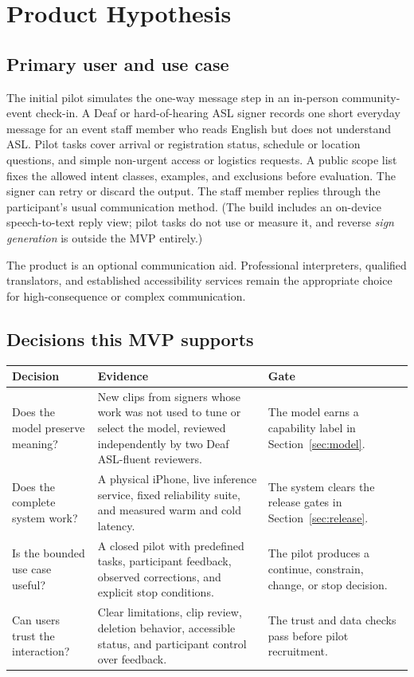 \documentclass[11pt]{article}
\begin{document}
\section{Product Hypothesis}

\subsection{Primary user and use case}

The initial pilot simulates the one-way message step in an in-person community-event
check-in. A Deaf or hard-of-hearing ASL signer records one short everyday message for
an event staff member who reads English but does not understand ASL. Pilot tasks
cover arrival or registration status, schedule or location questions, and simple
non-urgent access or logistics requests. A public scope list fixes the allowed intent
classes, examples, and exclusions before evaluation. The signer can retry or discard
the output. The staff member replies through the participant's usual communication
method. (The build includes an on-device speech-to-text reply view; pilot tasks do
not use or measure it, and reverse \emph{sign generation} is outside the MVP
entirely.)

The product is an optional communication aid. Professional interpreters, qualified
translators, and established accessibility services remain the appropriate choice for
high-consequence or complex communication.

\subsection{Decisions this MVP supports}

\begin{center}
\begin{tabularx}{\textwidth}{@{}P{2.8cm}YY@{}}
\toprule
Decision & Evidence & Gate \\
\midrule
Does the model preserve meaning? & New clips from signers whose work was not used to
tune or select the model, reviewed independently by two Deaf ASL-fluent reviewers. &
The model earns a capability label in Section~\ref{sec:model}. \\
Does the complete system work? & A physical iPhone, live inference service, fixed
reliability suite, and measured warm and cold latency. & The system clears the release
gates in Section~\ref{sec:release}. \\
Is the bounded use case useful? & A closed pilot with predefined tasks, participant
feedback, observed corrections, and explicit stop conditions. & The pilot produces a
continue, constrain, change, or stop decision. \\
Can users trust the interaction? & Clear limitations, clip review, deletion behavior,
accessible status, and participant control over feedback. & The trust and data checks
pass before pilot recruitment. \\
\bottomrule
\end{tabularx}
\end{center}
\end{document}
